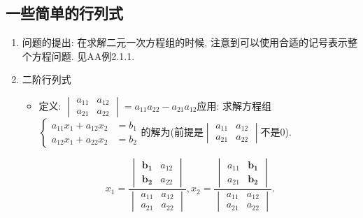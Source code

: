 \subsection*{一些简单的行列式}
\begin{enumerate}
\item 问题的提出: 在求解二元一次方程组的时候, 注意到可以使用合适的记号表示整个方程问题. 见AA例2.1.1.
\item 二阶行列式
\begin{itemize}
\item 定义: $\begin{vmatrix}a_{11} & a_{12}\\
a_{21} & a_{22}
\end{vmatrix}=a_{11}a_{22}-a_{21}a_{12}$应用: 求解方程组$\begin{cases}
a_{11}x_{1}+a_{12}x_{2} & =b_{1}\\
a_{12}x_{1}+a_{22}x_{2} & =b_{2}
\end{cases}$的解为(前提是$\begin{vmatrix}a_{11} & a_{12}\\
a_{21} & a_{22}
\end{vmatrix}$不是0).
\end{itemize}
\[
x_{1}=\frac{\begin{vmatrix}\boldsymbol{b}_{\boldsymbol{1}} & a_{12}\\
\boldsymbol{b}_{\boldsymbol{2}} & a_{22}
\end{vmatrix}}{\begin{vmatrix}a_{11} & a_{12}\\
a_{21} & a_{22}
\end{vmatrix}},x_{2}=\frac{\begin{vmatrix}a_{11} & \boldsymbol{b}_{\boldsymbol{1}}\\
a_{21} & \boldsymbol{b}_{\boldsymbol{2}}
\end{vmatrix}}{\begin{vmatrix}a_{11} & a_{12}\\
a_{21} & a_{22}
\end{vmatrix}}.
\]


\end{enumerate}
